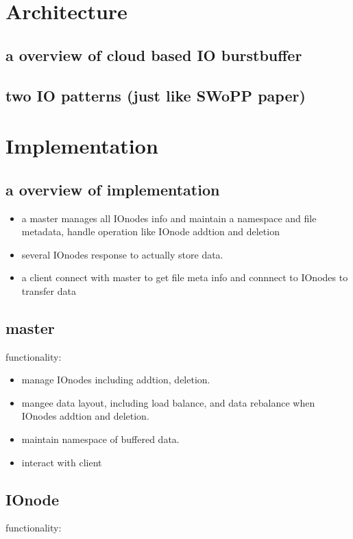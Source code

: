 \documentclass{article}
\begin{document}
\section{Architecture}
\subsection{a overview of cloud based IO burstbuffer}
\subsection{two IO patterns (just like SWoPP paper)}

\section{Implementation}
\subsection{a overview of implementation}
\begin{itemize}
	\item a master manages all IOnodes info and maintain a namespace and file metadata, handle operation like IOnode addtion and deletion
	\item several IOnodes response to actually store data.
	\item a client connect with master to get file meta info and connnect to IOnodes to transfer data
\end{itemize}

\subsection{master}
functionality:

	\begin{itemize}
		\item manage IOnodes including addtion, deletion.
		\item mangee data layout, including load balance, and data rebalance when IOnodes addtion and deletion.
		\item maintain namespace of buffered data.
		\item interact with client
	\end{itemize}

\subsection{IOnode}
functionality:
\end{document}
